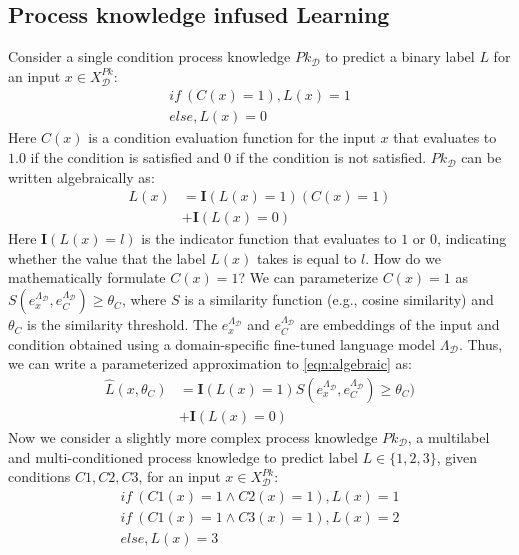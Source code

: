 \documentclass[letterpaper]{article} %
\begin{document}
\subsection{Process knowledge infused Learning}
Consider a single condition process knowledge $Pk_{\mathcal{D}}$ to predict a binary label $L$ for an input $x \in X^{Pk}_{\mathcal{D}}$:
\begin{align*}
    if~(C(x)=1), L(x)=1 \\
    else, L(x)=0
\end{align*}
Here $C(x)$ is a condition evaluation function for the input $x$ that evaluates to $1.0$ if the condition is satisfied and $0$ if the condition is not satisfied. $Pk_{\mathcal{D}}$ can be written algebraically as:
\begin{equation}\label{eqn:algebraic}
\begin{split}
L(x) &= \mathbf{I}(L(x)=1)(C(x)=1) \\
&+ \mathbf{I}(L(x)=0)
\end{split}
\end{equation}Here $\mathbf{I}(L(x)=l)$ is the indicator function that evaluates to $1$ or $0$, indicating whether the value that the label $L(x)$ takes is equal to $l$. How do we mathematically formulate $C(x)=1$?
We can parameterize $C(x)=1$ as $S(e^{\Lambda_{\mathcal{D}}}_x, e^{\Lambda_{\mathcal{D}}}_C) \geq \theta_C$, where $S$ is a similarity function (e.g., cosine similarity) and $\theta_C$ is the similarity threshold. The $e^{\Lambda_{\mathcal{D}}}_x$ and $e^{\Lambda_{\mathcal{D}}}_C$ are embeddings of the input and condition obtained using a domain-specific fine-tuned language model $\Lambda_{\mathcal{D}}$. Thus, we can write a parameterized approximation to \eqref{eqn:algebraic} as:
\begin{equation}\label{eqn:sim}
\begin{split}
\hat{L}(x,\theta_C) &= \mathbf{I}(L(x)=1)S(e^{\Lambda_{\mathcal{D}}}_x, e^{\Lambda_{\mathcal{D}}}_C) \geq \theta_C) \\
&+ \mathbf{I}(L(x)=0)
\end{split}
\end{equation}
Now we consider a slightly more complex process knowledge $Pk_{\mathcal{D}}$, a multilabel and multi-conditioned process knowledge to predict label $L \in \{1,2,3\}$, given conditions $C1, C2, C3$, for an input $x \in X^{Pk}_{\mathcal{D}}$:
\begin{align*}
    if~(C1(x)=1 \land C2(x) = 1), L(x) = 1 \\
    if~(C1(x)=1 \land C3(x) = 1), L(x) = 2 \\
    else, L(x) = 3
\end{align*}
\end{document}
